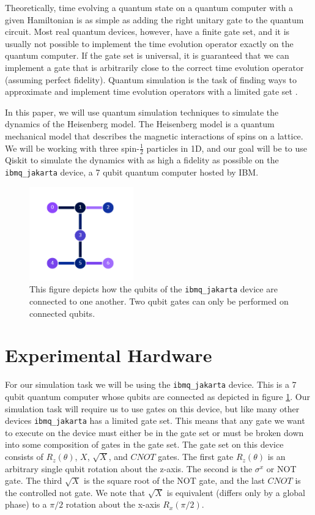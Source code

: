 \documentclass[aps,prl, reprint]{revtex4-2}
\begin{document}
Theoretically, time evolving a quantum state on a quantum computer with a given Hamiltonian is as simple as adding the right unitary gate to the quantum circuit. Most real quantum devices, however, have a finite gate set, and it is usually not possible to implement the time evolution operator exactly on the quantum computer. If the gate set is universal, it is guaranteed that we can implement a gate that is arbitrarily close to the correct time evolution operator (assuming perfect fidelity). Quantum simulation is the task of finding ways to approximate and implement time evolution operators with a limited gate set \cite{lloyd1996universal}.

In this paper, we will use quantum simulation techniques to simulate the dynamics of the Heisenberg model. The Heisenberg model is a quantum mechanical model that describes the magnetic interactions of spins on a lattice. We will be working with three spin-$\frac{1}{2}$ particles in 1D, and our goal will be to use Qiskit to simulate the dynamics with as high a fidelity as possible on the \texttt{ibmq\_jakarta} device, a 7 qubit quantum computer hosted by IBM.
\begin{figure}[b]
\includegraphics[width=0.4\textwidth]{JakartaDiagram.png}
\caption{This figure depicts how the qubits of the \texttt{ibmq\_jakarta} device are connected to one another. Two qubit gates can only be performed on connected qubits.}
\label{fig:JakartaConnect}
\end{figure}
\section{Experimental Hardware}

For our simulation task we will be using the \texttt{ibmq\_jakarta} device. This is a 7 qubit quantum computer whose qubits are connected as depicted in figure \ref{fig:JakartaConnect}. Our simulation task will require us to use gates on this device, but like many other devices \texttt{ibmq\_jakarta} has a limited gate set. This means that any gate we want to execute on the device must either be in the gate set or must be broken down into some composition of gates in the gate set. The gate set on this device consists of $R_z(\theta)$, $X$, $\sqrt{X}$, and $CNOT$ gates. The first gate $R_z(\theta)$ is an arbitrary single qubit rotation about the z-axis. The second is the $\sigma^{x}$ or NOT gate. The third $\sqrt{X}$ is the square root of the NOT gate, and the last $CNOT$ is the controlled not gate. We note that $\sqrt{X}$ is equivalent (differs only by a global phase) to a $\pi/2$ rotation about the x-axis $R_x(\pi/2)$.
\end{document}
